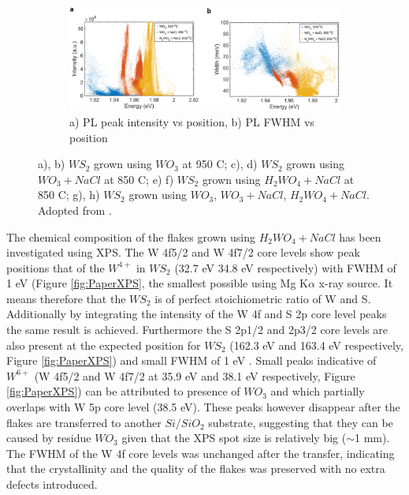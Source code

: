 \begin{figure}[H]
\begin{center}
		\begin{subfigure}[b]{0.8\textwidth}
			\includegraphics[scale=0.3]{PaperSIScatterComparison.png}
			\caption{a) PL peak intensity vs position, b) PL FWHM vs position}
			\label{fig:PaperSIScatterComparison}
		\end{subfigure}
		\caption{a), b) $WS_2$ grown using $WO_3$ at 950 {\degree}C; c), d) $WS_2$ grown using $WO_3+NaCl$ at 850 {\degree}C; e) f) $WS_2$ grown using $H_2WO_4+NaCl$ at 850 {\degree}C; g), h) $WS_2$ grown using $WO_3$, $WO_3+NaCl$, $H_2WO_4+NaCl$. Adopted from \cite{Reale2017}.}
	\end{center}
\end{figure}
\newpage
The chemical composition of the flakes grown using $H_2WO_4 + NaCl$ has been investigated using XPS. The W 4f5/2 and W 4f7/2 core levels show peak positions that of the $W^{4+}$ in $WS_2$ \cite{Cattelan2015}\cite{Martinez2004} (32.7 eV 34.8 eV respectively) with FWHM of 1 eV (Figure \ref{fig:PaperXPS}, the smallest possible using Mg K$\alpha$ x-ray source. It means therefore that the $WS_2$ is of perfect stoichiometric ratio of W and S. Additionally by integrating the intensity of the W 4f and S 2p core level peaks the same result is achieved. Furthermore the S 2p1/2 and 2p3/2 core levels are also present at the expected position for $WS_2$ (162.3 eV and 163.4 eV respectively, Figure \ref{fig:PaperXPS}) and small FWHM of 1 eV \cite{Martinez2004}. Small peaks indicative of $W^{6+}$ (W 4f5/2 and W 4f7/2 at 35.9 eV and 38.1 eV respectively, Figure \ref{fig:PaperXPS}) can be attributed to presence of $WO_3$ and which partially overlaps with W 5p core level (38.5 eV). These peaks however disappear after the flakes are transferred to another $Si/SiO_2$ substrate, suggesting that they can be caused by residue $WO_3$ given that the XPS spot size is relatively big ({$\sim$}1 mm). The FWHM of the W 4f core levels was unchanged after the transfer, indicating that the crystallinity and the quality of the flakes was preserved with no extra defects introduced.

